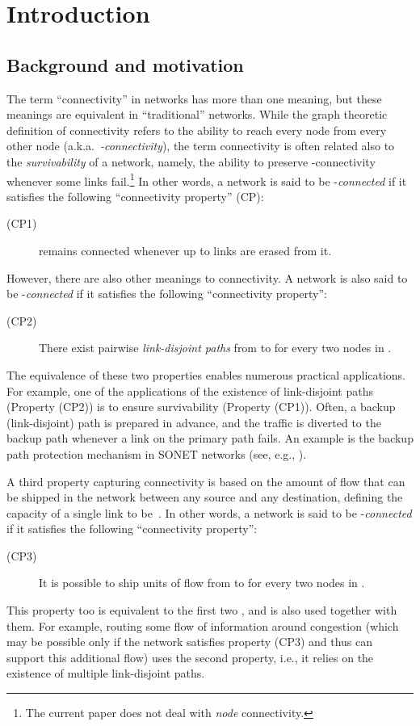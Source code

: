 \LongVersion \documentclass[11pt]{article}
\theoremstyle{definition}
\theoremstyle{plain}
\begin{document}
\section{Introduction}
\subsection{Background and motivation}


The term ``connectivity'' in networks has more than one meaning,
but these meanings are equivalent in ``traditional'' networks.
While the graph theoretic definition of connectivity refers to the ability to
reach every node from every other node (a.k.a.\ \emph{-connectivity}), the
term connectivity is often related also to the \emph{survivability} of a
network, namely, the ability to preserve -connectivity whenever some links
fail.\footnote{
The current paper does not deal with {\em node} connectivity.
}
In other words, a network  is said to be -{\em connected} if it
satisfies the following ``connectivity property'' (CP):
\begin{description}
\item[(CP1)]  remains connected whenever up to  links are erased from
it.
\end{description}

However, there are also other meanings to connectivity.
A network  is also said to be -{\em connected} if it
satisfies the following  ``connectivity property'':
\begin{description}
\item[(CP2)] There exist  pairwise {\em link-disjoint paths} from  to
 for every two nodes  in .
\end{description}
The equivalence of these two properties \cite{Meng27} enables numerous
practical applications.
For example, one of the applications of the existence of link-disjoint paths
(Property (CP2)) is to ensure survivability (Property (CP1)).
Often, a backup (link-disjoint) path is prepared in advance, and the traffic
is diverted to the backup path whenever a link on the primary path fails.
An example is the backup path protection mechanism in SONET networks (see,
e.g., \cite{protection}).

A third property capturing connectivity is based on the amount of flow that
can be shipped in the network between any source and any destination, defining
the capacity of a single link to be~.
In other words, a network  is said to be -{\em connected} if it
satisfies the following  ``connectivity property'':
\begin{description}
\item[(CP3)] It is possible to ship  units of flow from  to  for
every two nodes  in .
\end{description}
This property too is equivalent to the first two \cite{FF56}, and is also used
together with them.
For example, routing some flow of information around congestion (which may be
possible only if the network satisfies property (CP3) and thus can support
this additional flow) uses the second property, i.e., it relies on the
existence of multiple link-disjoint paths.
\end{document}
